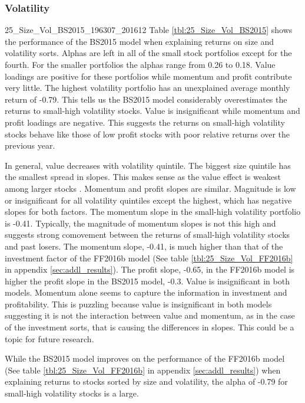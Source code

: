 \subsubsection{Volatility}

{25_Size_Vol_BS2015_196307_201612}
Table \ref{tbl:25_Size_Vol_BS2015} shows the performance of the BS2015 model when
explaining returns on size and volatility sorts. Alphas are left in all of the small stock
portfolios except for the fourth. For the smaller portfolios the alphas range from 0.26 to
0.18. Value loadings are positive for these portfolios while momentum and profit
contribute very little. The highest volatility portfolio has an unexplained average
monthly return of -0.79. This tells us the BS2015 model considerably overestimates the
returns to small-high volatility stocks. Value is insignificant while momentum and profit
loadings are negative. This suggests the returns on small-high volatility stocks behave
like those of low profit stocks with poor relative returns over the previous year.

In general, value decreases with volatility quintile. The biggest size quintile has the
smallest spread in slopes. This makes sense as the value effect is weakest among larger
stocks \parencite{asness2015fact}. Momentum and profit slopes are similar. Magnitude is
low or insignificant for all volatility quintiles except the highest, which has negative
slopes for both factors. The momentum slope in the small-high volatility portfolio is
-0.41. Typically, the magnitude of momentum slopes is not this high and suggests strong
comovement between the returns of small-high volatility stocks and past losers. The
momentum slope, -0.41, is much higher than that of the investment factor of the FF2016b
model (See table \ref{tbl:25_Size_Vol_FF2016b} in appendix \ref{sec:addl_results}). The
profit slope, -0.65, in the FF2016b model is higher the profit slope in the BS2015 model,
-0.3. Value is insignificant in both models. Momentum alone seems to capture the
information in investment and profitability. This is puzzling because value is
insignificant in both models suggesting it is not the interaction between value and
momentum, as in the case of the investment sorts, that is causing the differences in
slopes. This could be a topic for future research.

While the BS2015 model improves on the performance of the FF2016b model (See table
\ref{tbl:25_Size_Vol_FF2016b} in appendix \ref{sec:addl_results}) when explaining returns
to stocks sorted by size and volatility, the alpha of -0.79 for small-high volatility
stocks is a large.

